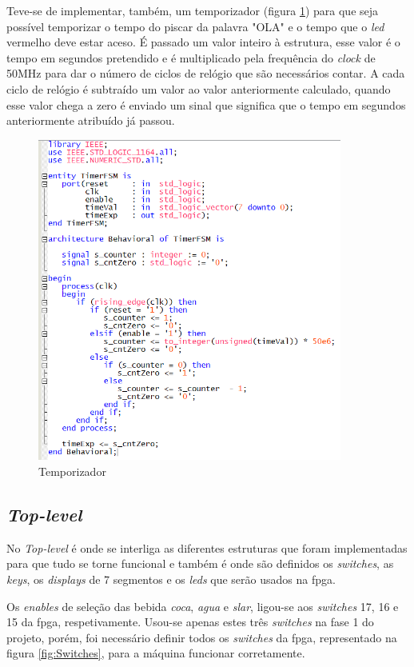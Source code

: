 \documentclass{report}
\begin{document}
Teve-se de implementar, também, um temporizador (figura \ref{fig:Temporizador}) para que seja possível temporizar o tempo do piscar da palavra "OLA" e o tempo que o \textit{led} vermelho deve estar aceso. É passado um valor inteiro à estrutura, esse valor é o tempo em segundos pretendido e é multiplicado pela frequência do \textit{clock} de 50MHz para dar o número de ciclos de relógio que são necessários contar. A cada ciclo de relógio é subtraído um valor ao valor anteriormente calculado, quando esse valor chega a zero é enviado um sinal que significa que o tempo em segundos anteriormente atribuído já passou.

\begin{figure}[H]
    \centering
    \includegraphics[width = 10cm]{TimerFSM.png}
    \caption{Temporizador}
    \label{fig:Temporizador}
\end{figure}

\newpage

\subsection{\textit{Top-level}}
No \textit{Top-level} é onde se interliga as diferentes estruturas que foram implementadas para que tudo se torne funcional e também é onde são definidos os \textit{switches}, as \textit{keys}, os \textit{displays} de 7 segmentos e os \textit{leds} que serão usados na \ac{fpga}.

Os \textit{enables} de seleção das bebida \textit{coca}, \textit{agua} e \textit{slar}, ligou-se aos \textit{switches} 17, 16 e 15 da \ac{fpga}, respetivamente. Usou-se apenas estes três \textit{switches} na fase 1 do projeto, porém, foi necessário definir todos os \textit{switches} da \ac{fpga}, representado na figura \ref{fig:Switches}, para a máquina funcionar corretamente.
\end{document}
